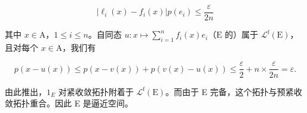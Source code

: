 \[
| \ell_ {i} (x) - f _ {i} (x) | p (e _ {i}) \leqslant \frac {\varepsilon}{2 n}
\]

其中 \(x \in \mathrm{A}\)，\(1 \leqslant i \leqslant n\)。自同态 \(u \colon x \mapsto \sum_{i=1}^{n} f_i(x)e_i\)（\(\mathrm{E}\) 的）属于 \(\mathcal{L}^{\mathrm{f}}(\mathrm{E})\)，且对每个 \(x \in \mathrm{A}\)，我们有

\[
p (x - u (x)) \leqslant p (x - v (x)) + p (v (x) - u (x)) \leqslant \frac {\varepsilon}{2} + n \times \frac {\varepsilon}{2 n} = \varepsilon .
\]

由此推出，\(1_{E}\) 对紧收敛拓扑附着于 \(\mathcal{L}^{\mathrm{f}}(\mathrm{E})\)。而由于 E 完备，这个拓扑与预紧收敛拓扑重合。因此 E 是逼近空间。

